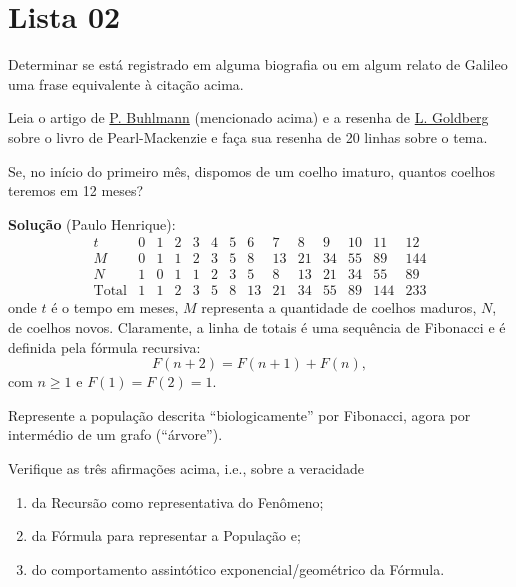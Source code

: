 \section*{Lista 02}


\begin{exercise}
Determinar se está registrado em alguma biografia ou em algum relato de Galileo uma frase equivalente à citação acima.
\end{exercise}


\begin{exercise}
Leia o artigo de \href{https://www.pnas.org/content/pnas/117/42/25963.full.pdf}{P. Buhlmann} (mencionado acima) e a resenha de \href{https://www.ams.org/journals/notices/201907/rnoti-p1093.pdf}{L. Goldberg} sobre o livro de Pearl-Mackenzie e faça sua resenha de 20 linhas sobre o tema. 
\end{exercise}

{\color{red}
%
%
}


\begin{exercise}
Se, no início do primeiro mês, dispomos de um coelho imaturo, quantos coelhos teremos em 12 meses?
\end{exercise}

{\color{red} \textbf{Solução} (Paulo Henrique):
\[\begin{array}{c|c|c|c|c|c|c|c|c|c|c|c|c|c}
t & 0 & 1 & 2 & 3 & 4 & 5 & 6 & 7 & 8 & 9 & 10 & 11 & 12 \\ \hline
M & 0 & 1 & 1 & 2 & 3 & 5 & 8 & 13 & 21 & 34 & 55 & 89 & 144 \\ \hline
N & 1 & 0 & 1 & 1 & 2 & 3 & 5 & 8 & 13 & 21 & 34 & 55 & 89 \\ \hline
\mbox{Total} & 1 & 1 & 2 & 3 & 5 & 8 & 13 & 21 & 34 & 55 & 89 & 144 & 233
\end{array}\]
onde \(t\) é o tempo em meses, \(M\) representa a quantidade de coelhos maduros, \(N\), de coelhos novos. Claramente, a linha de totais é uma sequência de Fibonacci e é definida pela fórmula recursiva:
\[F(n+2)=F(n+1)+F(n),\]
com \(n \ge 1\)  e \(F(1) = F(2) = 1.\)
}


\begin{exercise}
Represente a população descrita ``biologicamente'' por Fibonacci, agora por intermédio de um grafo (``árvore'').
\end{exercise}



\begin{exercise}
Verifique as três afirmações acima, i.e., sobre a veracidade
\begin{enumerate}
\item da Recursão como representativa do Fenômeno;
\item da Fórmula para representar a População e;
\item do comportamento assintótico exponencial/geométrico da Fórmula.
\end{enumerate}
\end{exercise}

